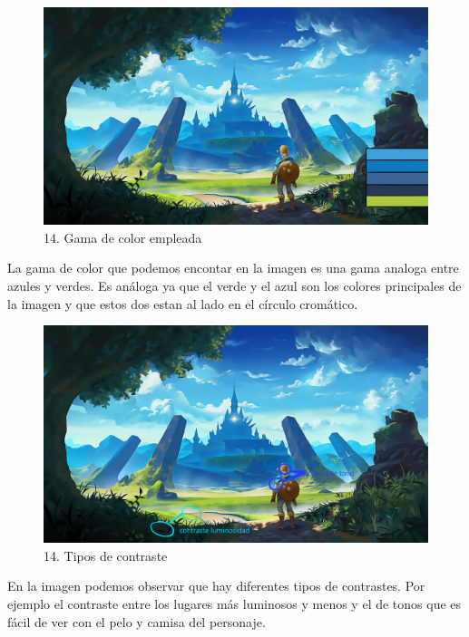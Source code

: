 \documentclass[12pt]{article}
\begin{document}
    \begin{figure}[H]
      \centering
      \includegraphics[scale=0.35]{images/Selena/14_concept_art tabla.jpg}
      \caption{\small 14. Gama de color empleada}
    \end{figure}
    La gama de color que podemos encontar en la imagen es una gama analoga entre azules y verdes. Es análoga ya que el verde y el azul son los colores principales de la imagen y que estos dos estan al lado en el círculo cromático. 

    \begin{figure}[H]
      \centering
      \includegraphics[scale=0.35]{images/Selena/14_concept_art con.jpg}
      \caption{\small 14. Tipos de contraste}
    \end{figure}
    En la imagen podemos observar que hay diferentes tipos de contrastes. Por ejemplo el contraste entre los lugares más luminosos y menos y el de tonos que es fácil de ver con el pelo y camisa del personaje. 
\end{document}
